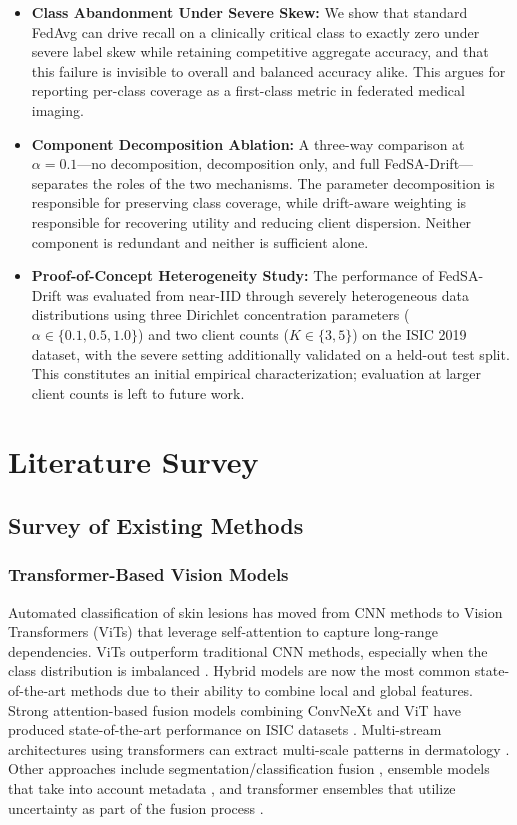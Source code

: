 \documentclass{ieeeaccess}
\newcommand{\sadrift}{FedSA-Drift}
\begin{document}
\begin{itemize}
    \item \textbf{Class Abandonment Under Severe Skew:} We show that standard FedAvg can drive recall on a clinically critical class to exactly zero under severe label skew while retaining competitive aggregate accuracy, and that this failure is invisible to overall and balanced accuracy alike. This argues for reporting per-class coverage as a first-class metric in federated medical imaging.
    \item \textbf{Component Decomposition Ablation:} A three-way comparison at $\alpha = 0.1$---no decomposition, decomposition only, and full \sadrift{}---separates the roles of the two mechanisms. The parameter decomposition is responsible for preserving class coverage, while drift-aware weighting is responsible for recovering utility and reducing client dispersion. Neither component is redundant and neither is sufficient alone.
    \item \textbf{Proof-of-Concept Heterogeneity Study:} The performance of \sadrift{} was evaluated from near-IID through severely heterogeneous data distributions using three Dirichlet concentration parameters ($\alpha \in \{0.1, 0.5, 1.0\}$) and two client counts ($K \in \{3, 5\}$) on the ISIC 2019 dataset, with the severe setting additionally validated on a held-out test split. This constitutes an initial empirical characterization; evaluation at larger client counts is left to future work.


\end{itemize}

\section{Literature Survey}
\subsection{Survey of Existing Methods}
\subsubsection{Transformer-Based Vision Models}
Automated classification of skin lesions has moved from CNN methods to Vision Transformers (ViTs) that leverage self-attention to capture long-range dependencies. ViTs outperform traditional CNN methods, especially when the class distribution is imbalanced \cite{Aguirre2024}. Hybrid models are now the most common state-of-the-art methods due to their ability to combine local and global features. Strong attention-based fusion models combining ConvNeXt and ViT have produced state-of-the-art performance on ISIC datasets \cite{Naeem2025}. Multi-stream architectures using transformers can extract multi-scale patterns in dermatology \cite{Alshdaifat2025}. Other approaches include segmentation/classification fusion \cite{HyperFusionNet2025}, ensemble models that take into account metadata \cite{HasanRifat2024}, and transformer ensembles that utilize uncertainty as part of the fusion process \cite{Zoravar2024}.
\end{document}
